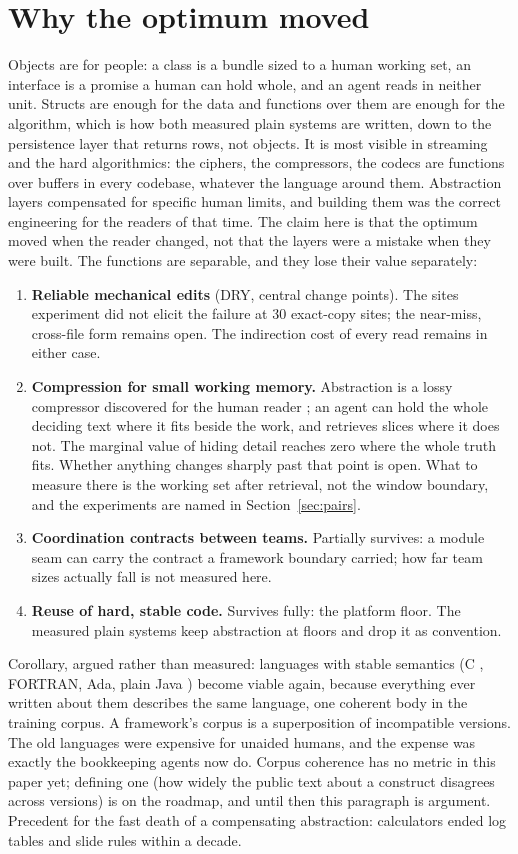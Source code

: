 \documentclass[journal]{IEEEtran}
\begin{document}
\section{Why the optimum moved}

Objects are for people: a class is a bundle sized to a human working set,
an interface is a promise a human can hold whole, and an agent reads in
neither unit. Structs are enough for the data and functions over them are
enough for the algorithm, which is how both measured plain systems are
written, down to the persistence layer that returns rows, not objects.
It is most visible in streaming and the hard algorithmics: the ciphers, the
compressors, the codecs are functions over buffers in every codebase,
whatever the language around them. Abstraction layers compensated for specific human limits, and building
them was the correct engineering for the readers of that time. The claim here is that
the optimum moved when the reader changed, not that the layers were a
mistake when they were built. The functions are separable, and they lose their
value separately:

\begin{enumerate}[nosep]
\item \textbf{Reliable mechanical edits} (DRY, central change points). The
sites experiment did not elicit the failure at 30 exact-copy sites; the
near-miss, cross-file form remains open. The indirection cost of every read
remains in either case.
\item \textbf{Compression for small working memory.} Abstraction is a lossy
compressor discovered for the human reader \cite{compressors}; an agent
can hold the whole deciding text where it fits beside the work, and
retrieves slices where it does not. The marginal value of hiding detail reaches
zero where the whole truth fits. Whether anything changes sharply past
that point is open. What to measure there is the working set after
retrieval, not the window boundary, and the experiments are named in
Section~\ref{sec:pairs}.
\item \textbf{Coordination contracts between teams.} Partially survives:
a module seam can carry the contract a framework boundary carried; how far
team sizes actually fall is not measured here.
\item \textbf{Reuse of hard, stable code.} Survives fully: the platform
floor. The measured plain systems keep abstraction at floors and drop it as
convention.
\end{enumerate}

Corollary, argued rather than measured: languages with stable semantics
(C \cite{knr}, FORTRAN, Ada, plain Java \cite{jls,jdbc}) become viable
again, because everything ever written about them describes the same
language, one coherent body in the training corpus. A framework's
corpus is a superposition of incompatible versions. The old languages were
expensive for unaided humans, and the expense was exactly the bookkeeping
agents now do. Corpus coherence has no metric in this paper yet; defining
one (how widely the public text about a construct disagrees across versions)
is on the roadmap, and until then this paragraph is argument.
Precedent for the fast death of a compensating abstraction: calculators
ended log tables and slide rules within a decade.
\end{document}
